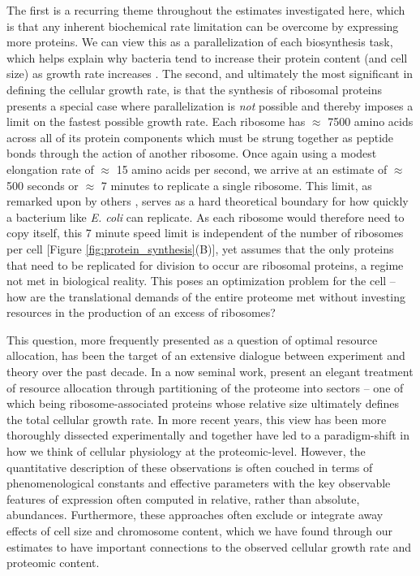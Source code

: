 The first is a recurring theme throughout the estimates investigated here, which
is that any inherent biochemical rate limitation can be overcome by expressing
more proteins. We can view this as a parallelization of each biosynthesis task,
which helps explain why bacteria tend to increase their protein content (and
cell size) as growth rate increases \citep{ojkic2019}. The second, and
ultimately the most significant in defining the cellular growth rate, is that
the synthesis of ribosomal proteins presents a special case where
parallelization is \textit{not} possible and thereby imposes a limit on the
fastest possible growth rate. Each ribosome has $\approx$ 7500 amino acids
across all of its protein components which must be strung together as peptide
bonds through the action of another ribosome. Once again using a modest
elongation rate of $\approx$ 15 amino acids per second, we arrive at an estimate of
$\approx$ 500 seconds or $\approx$ 7 minutes to replicate a single ribosome.
This limit, as remarked upon by others \citep{dill2011}, serves as a hard
theoretical boundary for how quickly a bacterium like \textit{E. coli} can
replicate. As each ribosome would therefore need to copy itself, this 7 minute
speed limit is independent of the number of ribosomes per cell
[Figure \ref{fig:protein_synthesis}(B)], yet assumes that the only proteins that need to be
replicated for division to occur are ribosomal proteins, a regime
not met in biological reality. This poses an optimization problem for the cell
-- how are the translational demands of the entire proteome met without
investing resources in the production of an excess of ribosomes?

This question, more frequently presented as a question of optimal resource
allocation, has been the target of an extensive dialogue between experiment and
theory over the past decade. In a now seminal work,
\cite{scott2010} present an elegant treatment of resource allocation through
partitioning of the proteome into sectors -- one of which being
ribosome-associated proteins whose relative size ultimately defines
the total cellular growth rate. In more recent years, this view has been more
thoroughly dissected experimentally
\citep{klumpp2014,basan2015,dai2018, dai2016, erickson2017} and together
have led to a paradigm-shift in how we think of cellular physiology at the
proteomic-level. However, the quantitative description of these  observations is
often couched in terms of phenomenological constants and effective parameters
with the key observable features of expression often computed in relative, rather
than absolute, abundances. Furthermore, these approaches often exclude or
integrate away effects of cell size and chromosome content, which we have
found through our estimates to have important connections to the observed cellular
growth rate  and proteomic content.

